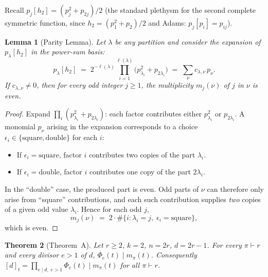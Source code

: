\documentclass[11pt]{article}
\newtheorem{theorem}{Theorem}
\newtheorem{lemma}[theorem]{Lemma}
\theoremstyle{plain}
\theoremstyle{definition}
\theoremstyle{remark}
\begin{document}
Recall $p_j[h_2] = (p_j^2 + p_{2j}) / 2$ (the standard plethysm for the
second complete symmetric function, since $h_2 = (p_1^2 + p_2)/2$ and
Adams: $p_j[p_i] = p_{ij}$).

\begin{lemma}[Parity Lemma]\label{lem:parity}
Let $\lambda$ be any partition and consider the expansion of
$p_\lambda[h_2]$ in the power-sum basis:
\[
p_\lambda[h_2] \;=\; 2^{-\ell(\lambda)} \prod_{i=1}^{\ell(\lambda)} \bigl(p_{\lambda_i}^2 + p_{2\lambda_i}\bigr)
\;=\; \sum_{\nu} c_{\lambda, \nu}\, p_\nu.
\]
If $c_{\lambda, \nu} \neq 0$, then for every odd integer $j \ge 1$, the multiplicity $m_j(\nu)$ of $j$
in $\nu$ is even.
\end{lemma}

\begin{proof}
Expand $\prod_i (p_{\lambda_i}^2 + p_{2\lambda_i})$: each factor contributes
either $p_{\lambda_i}^2$ or $p_{2\lambda_i}$.  A monomial $p_\nu$ arising
in the expansion corresponds to a choice $\epsilon_i \in \{\text{square}, \text{double}\}$
for each $i$:
\begin{itemize}
\item If $\epsilon_i = \text{square}$, factor $i$ contributes two copies of the part $\lambda_i$.
\item If $\epsilon_i = \text{double}$, factor $i$ contributes one copy of the part $2\lambda_i$.
\end{itemize}
In the ``double'' case, the produced part is even.  Odd parts of $\nu$ can therefore only arise from
``square'' contributions, and each such contribution supplies \emph{two} copies of a given odd value $\lambda_i$.
Hence for each odd $j$,
\[
m_j(\nu) \;=\; 2 \cdot \#\bigl\{ i : \lambda_i = j,\; \epsilon_i = \text{square}\bigr\},
\]
which is even.
\end{proof}

\begin{theorem}[Theorem~A]\label{thm:A}
Let $r \ge 2$, $k = 2$, $n = 2r$, $d = 2r - 1$.  For every $\pi \vdash r$
and every divisor $e > 1$ of $d$, $\Phi_e(t) \mid m_\pi(t)$.
Consequently $[d]_t = \prod_{e \mid d,\; e > 1} \Phi_e(t) \mid m_\pi(t)$
for all $\pi \vdash r$.
\end{theorem}
\end{document}
